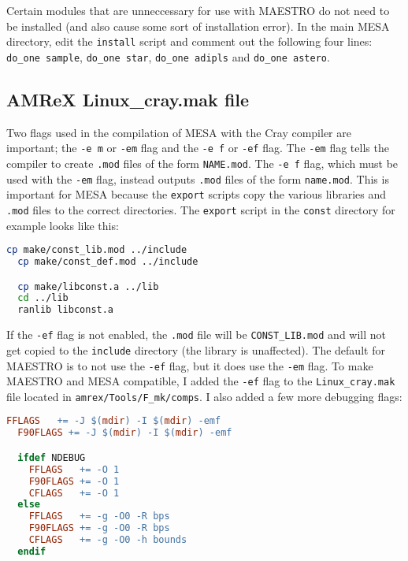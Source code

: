 Certain modules that are unneccessary for use with {\sf MAESTRO} do not need 
to be installed (and also cause some sort of installation error). In the 
main {\sf MESA} directory, edit the {\tt install} script and comment out 
the following four lines: {\tt do\_one sample}, {\tt do\_one star}, 
{\tt do\_one adipls} and {\tt do\_one astero}.

\subsection{{\sf AMReX Linux\_cray.mak} file}

Two flags used in the compilation of {\sf MESA} with the Cray compiler are 
important; the {\tt -e m} or {\tt -em} flag and the {\tt -e f} or {\tt -ef} 
flag. The {\tt -em} flag tells the compiler to create {\tt .mod} files of the 
form {\tt NAME.mod}. The {\tt -e f} flag, which must be used with the 
{\tt -em} flag, instead outputs {\tt .mod} files of the form {\tt name.mod}. 
This is important for {\sf MESA} because the {\tt export} scripts copy the 
various libraries and {\tt .mod} files to the correct directories. The 
{\tt export} script in the {\tt const} directory for example looks like this:
\begin{lstlisting}[language=bash,mathescape=false]
  cp make/const_lib.mod ../include
  cp make/const_def.mod ../include

  cp make/libconst.a ../lib
  cd ../lib
  ranlib libconst.a
\end{lstlisting}
If the {\tt -ef} flag is not enabled, the {\tt .mod} file will be 
{\tt CONST\_LIB.mod} and will not get copied to the {\tt include} directory 
(the library is unaffected). The default for {\sf MAESTRO} is to not use 
the {\tt -ef} flag, but it does use the {\tt -em} flag. To make {\sf MAESTRO} 
and {\sf MESA} compatible, I added the {\tt -ef} flag to the 
{\tt Linux\_cray.mak} file located in {\tt amrex/Tools/F\_mk/comps}. I also 
added a few more debugging flags:
\begin{lstlisting}[language=make,mathescape=false]
  FFLAGS   += -J $(mdir) -I $(mdir) -emf
  F90FLAGS += -J $(mdir) -I $(mdir) -emf

  ifdef NDEBUG
    FFLAGS   += -O 1
    F90FLAGS += -O 1
    CFLAGS   += -O 1
  else
    FFLAGS   += -g -O0 -R bps
    F90FLAGS += -g -O0 -R bps
    CFLAGS   += -g -O0 -h bounds
  endif 
\end{lstlisting}

